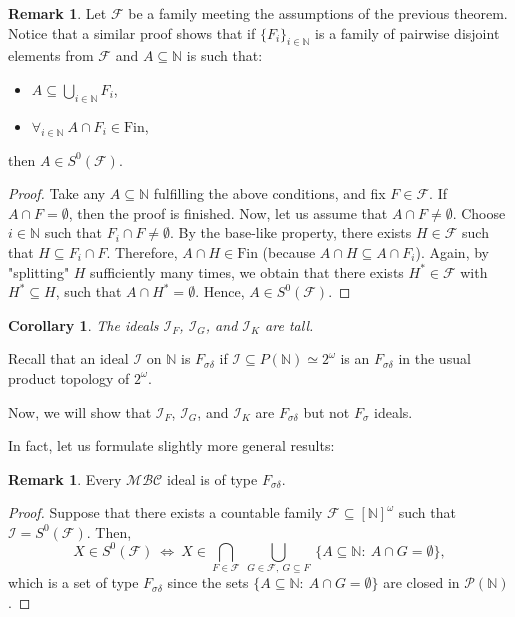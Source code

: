 \documentclass{amsart}
\newtheorem{cor}[thm]{Corollary}
\theoremstyle{definition}
\newtheorem{remark}[thm]{Remark}
\newcommand{\N}{{\mathbb N}}
\newcommand{\Fin}{\textrm{Fin}}
\newcommand{\I}{\mathcal I}
\newcommand{\InfSubs}{[\N]^{\omega}}
\newcommand{\MB}{S^0}
\newcommand{\MBC}{\mathcal{MBC}}
\begin{document}
\begin{remark}\label{remtall+}
Let $\mathcal{F}$ be a family meeting the assumptions of the previous theorem.
Notice that a similar proof shows that if $\{F_i\}_{i\in\N}$ is a family of pairwise disjoint elements from $\mathcal{F}$ and $A\subseteq \N$ is such that:
\begin{itemize}
	\item $A\subseteq \bigcup_{i\in\N}{F_i}$,
	\item $\forall_{i\in\N}\ A\cap F_i\in\Fin$,
\end{itemize}
then $A\in\MB(\mathcal{F})$.
\end{remark}

\begin{proof}
Take any $A\subseteq\N$ fulfilling the above conditions, and fix $F\in\mathcal{F}$. If $A\cap F=\emptyset$, then the proof is finished. Now, let us assume that $A\cap F \neq\emptyset$. Choose $i\in\N$ such that $F_i\cap F \neq\emptyset$. By the base-like property, there exists $H\in\mathcal{F}$ such that $H\subseteq F_i\cap F$. Therefore, $A\cap H\in\Fin$ (because $A\cap H\subseteq A\cap F_i$). Again, by "splitting" $H$ sufficiently many times, we obtain that there exists $H^*\in\mathcal{F}$ with $H^*\subseteq H$, such that $A\cap H^* =\emptyset$. Hence, $A\in\MB(\mathcal{F})$.
\end{proof}

\begin{cor} \label{tall}
The ideals $\I_F$, $\I_G$, and $\I_K$ are tall.
\end{cor}

Recall that an ideal $\I$ on $\N$ is $F_{\sigma\delta}$ if
$\I \subseteq P(\N) \simeq 2^\omega$
is an $F_{\sigma\delta}$ in the usual product topology
of $2^\omega$.

Now, we will show that $\I_F$, $\I_G$, and $\I_K$ are $F_{\sigma\delta}$ but not $F_{\sigma}$ ideals.

In fact, let us formulate slightly more general results:

\begin{remark}
Every $\MBC$ ideal is of type $F_{\sigma\delta}$.
\end{remark}

\begin{proof}
Suppose that there exists a countable family $\mathcal{F}\subseteq \InfSubs$ such that $\I = \MB(\mathcal{F})$. Then,
$$X\in \MB(\mathcal{F})\ \Longleftrightarrow\ X\in \bigcap_{F\in\mathcal{F}}\ \bigcup_{G\in\mathcal{F},\ G\subseteq F}\ \{A\subseteq\N :\ A\cap G=\emptyset\},$$
which is a set of type $F_{\sigma\delta}$ since the sets $\{A\subseteq\N :\ A\cap G=\emptyset\}$ are closed in $\mathcal{P}(\N)$.
\end{proof}
\end{document}
